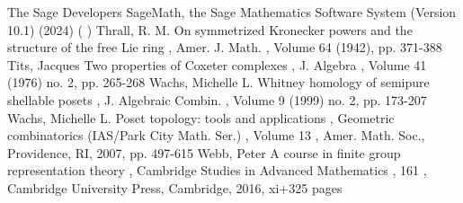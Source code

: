  The Sage Developers SageMath, the Sage Mathematics Software System (Version 10.1) (2024) ( )
 Thrall, R. M. On symmetrized Kronecker powers and the structure of the free Lie ring , Amer. J. Math. , Volume 64 (1942), pp. 371-388
 Tits, Jacques Two properties of Coxeter complexes , J. Algebra , Volume 41 (1976) no. 2, pp. 265-268
 Wachs, Michelle L. Whitney homology of semipure shellable posets , J. Algebraic Combin. , Volume 9 (1999) no. 2, pp. 173-207
 Wachs, Michelle L. Poset topology: tools and applications , Geometric combinatorics (IAS/Park City Math. Ser.) , Volume 13 , Amer. Math. Soc., Providence, RI, 2007, pp. 497-615
 Webb, Peter A course in finite group representation theory , Cambridge Studies in Advanced Mathematics , 161 , Cambridge University Press, Cambridge, 2016, xi+325 pages
